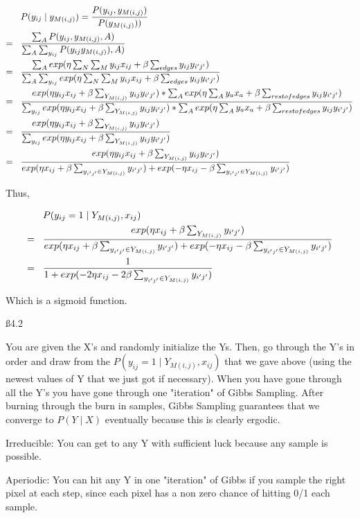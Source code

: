 \begin{align*}
& P(y_{ij} \mid y_{M(i,j)}) = \frac{P(y_{ij}, y_{M(i,j)})}{ P(y_{M(i,j)}))} \\ = \hspace{3 mm} &
\frac{\sum_A P(y_{ij}, y_{M(i,j)}, A)}{ \sum_A \sum_{y_{ij}} P(y_{ij} y_{M(i,j)}),A)} \\ = \hspace{3 mm} &
\frac{\sum_A exp(\eta \sum_N \sum_M y_{ij}x_{ij} +  \beta \sum_{edges} y_{ij}y_{i'j'})}{ \sum_A \sum_{y_{ij}} exp(\eta \sum_N \sum_M y_{ij}x_{ij} +  \beta \sum_{edges} y_{ij}y_{i'j'}) } \\ = \hspace{3 mm} & 
\frac{exp(\eta y_{ij}x_{ij} + \beta \sum_{Y_{M(i,j)}} y_{ij}y_{i'j'}) * \sum_A exp(\eta \sum_A y_a x_a + \beta \sum_{restofedges} y_{ij}y_{i'j'})}{\sum_{y_{ij}} exp(\eta y_{ij}x_{ij} + \beta \sum_{Y_{M(i,j)}} y_{ij}y_{i'j'}) * \sum_A exp(\eta \sum_A y_a x_a + \beta \sum_{restofedges} y_{ij}y_{i'j'})} \\ = \hspace{3 mm} &
\frac{exp(\eta y_{ij}x_{ij} + \beta \sum_{Y_{M(i,j)}} y_{ij}y_{i'j'})}{\sum_{y_{ij}} exp(\eta y_{ij}x_{ij} + \beta \sum_{Y_{M(i,j)}} y_{ij}y_{i'j'})}
\\ = \hspace{3 mm} & \frac{exp(\eta y_{ij}x_{ij} + \beta \sum_{Y_{M(i,j)}} y_{ij}y_{i'j'})}{exp(\eta x_{ij} + \beta \sum_{y_{i'j'} \in Y_{M(i,j)}} y_{i'j'}) + exp(-\eta x_{ij} - \beta \sum_{y_{i'j'} \in Y_{M(i,j)}} y_{i'j'})}
\end{align*}

Thus, 

\begin{align*}
& P(y_{ij} = 1 \mid Y_{M(i,j)}, x_{ij}) \\ = \hspace{3 mm} & \frac{exp(\eta x_{ij} + \beta \sum_{Y_{M(i,j)}} y_{i'j'})}{exp(\eta x_{ij} + \beta \sum_{y_{i'j'} \in Y_{M(i,j)}} y_{i'j'}) + exp(-\eta x_{ij} - \beta \sum_{y_{i'j'} \in Y_{M(i,j)}} y_{i'j'})} \\ = \hspace{3 mm} &
\frac{1}{1+ exp(-2\eta x_{ij} - 2\beta \sum_{y_{i'j'} \in Y_{M(i,j)}} y_{i'j'})}
\end{align*}

Which is a sigmoid function.

\ss {4.2}

You are given the X's and randomly initialize the Ys. Then, go through the Y's in order and draw from the $P(y_{ij} = 1 \mid Y_{M(i,j)}, x_{ij})$ that we gave above (using the newest values of Y that we just got if necessary). When you have gone through all the Y's you have gone through one "iteration" of Gibbs Sampling. After burning through the burn in samples, Gibbs Sampling guarantees that we converge to $P(Y \mid X)$ eventually because this is clearly ergodic.

Irreducible: You can get to any Y with sufficient luck because any sample is possible.

Aperiodic: You can hit any Y in one "iteration" of Gibbs if you sample the right pixel at each step, since each pixel has a non zero chance of hitting 0/1 each sample.

